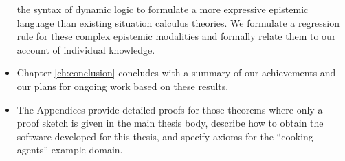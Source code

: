 \begin{itemize}
the syntax of dynamic logic to formulate a more expressive epistemic
language than existing situation calculus theories. We formulate a
regression rule for these complex epistemic modalities and formally
relate them to our account of individual knowledge. 
\item Chapter \ref{ch:conclusion} concludes with a summary of our achievements
and our plans for ongoing work based on these results. 
\item The Appendices provide detailed proofs for those theorems where only
a proof sketch is given in the main thesis body, describe how to obtain
the software developed for this thesis, and specify axioms for the
{}``cooking agents'' example domain. 
\end{itemize}
